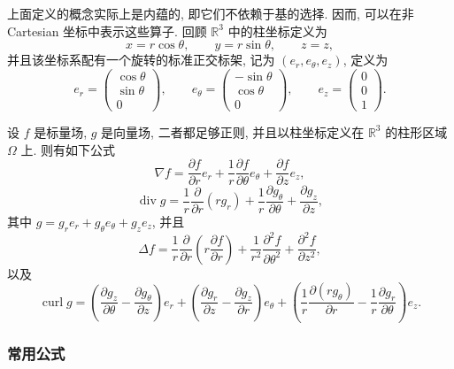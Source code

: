 上面定义的概念实际上是内蕴的, 即它们不依赖于基的选择. 因而, 可以在非 Cartesian 坐标中表示这些算子. 回顾 $\mathbb R^3$ 中的柱坐标定义为
\[
 x=r\cos\theta,\qquad y=r\sin\theta,\qquad z=z,
\]
并且该坐标系配有一个旋转的标准正交标架, 记为 $(e_r,e_\theta,e_z)$, 定义为
\[
 e_r=\begin{pmatrix}\cos\theta\\ \sin\theta\\ 0\end{pmatrix},
 \qquad
 e_\theta=\begin{pmatrix}-\sin\theta\\ \cos\theta\\ 0\end{pmatrix},
 \qquad
 e_z=\begin{pmatrix}0\\ 0\\ 1\end{pmatrix}.
\]

\begin{Proposition}
\label{prop:app-a-cylindrical-formulas}
设 $f$ 是标量场, $g$ 是向量场, 二者都足够正则, 并且以柱坐标定义在 $\mathbb R^3$ 的柱形区域 $\Omega$ 上. 则有如下公式
\[
 \nabla f=\frac{\partial f}{\partial r}e_r
 +\frac1r\frac{\partial f}{\partial\theta}e_\theta
 +\frac{\partial f}{\partial z}e_z,
\]
\begin{equation}
 \operatorname{div}g=\frac1r\frac{\partial}{\partial r}(rg_r)
 +\frac1r\frac{\partial g_\theta}{\partial\theta}
 +\frac{\partial g_z}{\partial z},
 \label{eq:app-a-cylindrical-divergence}
\end{equation}
其中 $g=g_re_r+g_\theta e_\theta+g_ze_z$, 并且
\begin{equation}
 \Delta f=\frac1r\frac{\partial}{\partial r}
 \left(r\frac{\partial f}{\partial r}\right)
 +\frac1{r^2}\frac{\partial^2f}{\partial\theta^2}
 +\frac{\partial^2f}{\partial z^2},
 \label{eq:app-a-cylindrical-laplacian}
\end{equation}
以及
\[
 \operatorname{curl}g=
 \left(\frac{\partial g_z}{\partial\theta}-\frac{\partial g_\theta}{\partial z}\right)e_r
 +\left(\frac{\partial g_r}{\partial z}-\frac{\partial g_z}{\partial r}\right)e_\theta
 +\left(\frac1r\frac{\partial(rg_\theta)}{\partial r}
 -\frac1r\frac{\partial g_r}{\partial\theta}\right)e_z.
\]
\end{Proposition}

\subsubsection{常用公式}
\label{subsec:app-a-useful-formulas}

